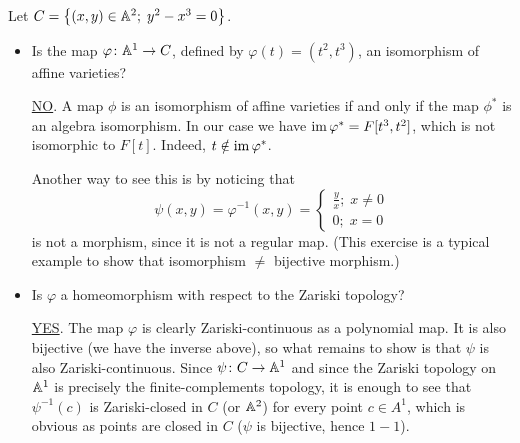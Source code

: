 \documentclass[a4paper, 12pt]{article}
\begin{document}
\begin{Exercise}
    Let $C = \left\{ (x, y) \in \mathbb{A}^2 ; \; y^2 - x^3 = 0 \right\}$.
    \begin{itemize}
        \item Is the map $\varphi \colon \mathbb{A}^1 \to C$, defined by $\varphi(t) = (t^2, t^3)$, an isomorphism of affine varieties?

            \underline{NO}.
            A map $\phi$ is an isomorphism of affine varieties if and only if the map $\phi^*$ is an algebra isomorphism.
            In our case we have $\operatorname{im}\varphi^* = F[t^3, t^2]$, which is not isomorphic to $F[t]$.
            Indeed, $t \notin \operatorname{im}\varphi^*$.

            Another way to see this is by noticing that
            \[
                \psi(x, y) = \varphi^{-1}(x, y) =
                \begin{cases}
                    \frac{y}{x} ; \; x \neq 0 \\
                    0 ; \; x = 0
                \end{cases}
            \]
            is not a morphism, since it is not a regular map.
            (This exercise is a typical example to show that isomorphism $\neq$ bijective morphism.)
        \item Is $\varphi$ a homeomorphism with respect to the Zariski topology?

            \underline{YES}.
            The map $\varphi$ is clearly Zariski-continuous as a polynomial map.
            It is also bijective (we have the inverse above), so what remains to show is that $\psi$ is also Zariski-continuous.
            Since $\psi \colon C \to \mathbb{A}^1$ and since the Zariski topology on $\mathbb{A}^1$ is precisely the finite-complements topology,
            it is enough to see that $\psi^{-1}(c)$ is Zariski-closed in $C$ (or $\mathbb{A}^2$) for every point $c \in A^1$,
            which is obvious as points are closed in $C$ ($\psi$ is bijective, hence $1-1$).
    \end{itemize}
\end{Exercise}
\end{document}
